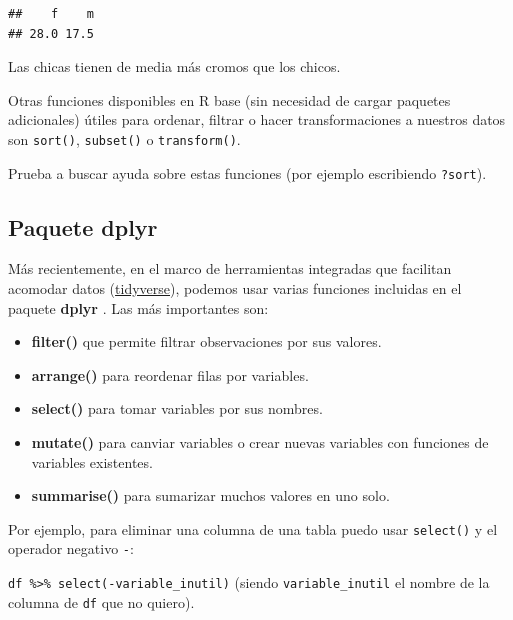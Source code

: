 \documentclass[]{book}
\newenvironment{Shaded}{\begin{snugshade}}{\end{snugshade}}
\newcommand{\KeywordTok}[1]{\textcolor[rgb]{0.13,0.29,0.53}{\textbf{#1}}}
\newcommand{\NormalTok}[1]{#1}
\newcommand{\OperatorTok}[1]{\textcolor[rgb]{0.81,0.36,0.00}{\textbf{#1}}}
\theoremstyle{definition}
\theoremstyle{definition}
\theoremstyle{definition}
\theoremstyle{remark}
\begin{document}
\begin{Shaded}
\end{Shaded}

\begin{verbatim}
##    f    m 
## 28.0 17.5
\end{verbatim}

Las chicas tienen de media más cromos que los chicos.

Otras funciones disponibles en R base (sin necesidad de cargar paquetes
adicionales) útiles para ordenar, filtrar o hacer transformaciones a
nuestros datos son \texttt{sort()}, \texttt{subset()} o
\texttt{transform()}.

Prueba a buscar ayuda sobre estas funciones (por ejemplo escribiendo
\texttt{?sort}).

\hypertarget{paquete-dplyr}{%
\subsection{Paquete dplyr}\label{paquete-dplyr}}

Más recientemente, en el marco de herramientas integradas que facilitan
acomodar datos (\href{http://tidyverse.org/}{tidyverse}), podemos usar
varias funciones incluidas en el paquete \textbf{dplyr} \citep{R-dplyr}.
Las más importantes son:

\begin{itemize}
\item
  \textbf{filter()} que permite filtrar observaciones por sus valores.
\item
  \textbf{arrange()} para reordenar filas por variables.
\item
  \textbf{select()} para tomar variables por sus nombres.
\item
  \textbf{mutate()} para canviar variables o crear nuevas variables con
  funciones de variables existentes.
\item
  \textbf{summarise()} para sumarizar muchos valores en uno solo.
\end{itemize}

Por ejemplo, para eliminar una columna de una tabla puedo usar
\texttt{select()} y el operador negativo \texttt{-}:

\texttt{df\ \%\textgreater{}\%\ select(-variable\_inutil)} (siendo
\texttt{variable\_inutil} el nombre de la columna de \texttt{df} que no
quiero).
\end{document}
